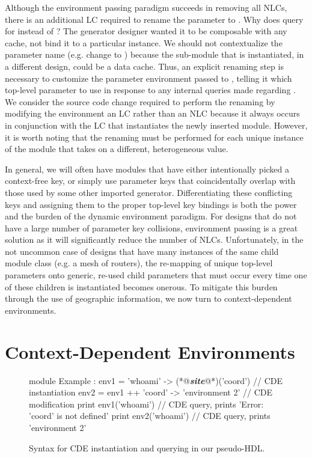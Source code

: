 Although the environment passing paradigm succeeds in removing all NLCs,
there is an additional LC required to rename the  parameter to .
Why does  query for  instead of ?
The generator designer wanted it to be composable with any cache, not bind it to a particular instance.
We should not contextualize the parameter name (e.g. change  to ) because the sub-module that is instantiated, in a different design, could be a data cache. 
Thus, an explicit renaming step is necessary to customize the parameter environment passed to , telling it which top-level parameter to use
in response to any internal queries made regarding .
We consider the source code change required to perform the renaming by modifying the environment an LC rather than an NLC because it always occurs in conjunction
with the LC that instantiates the newly inserted module.
However, it is worth noting that the renaming must be performed for each unique instance of the module that takes on a different, heterogeneous value.

In general, we will often have modules that have either intentionally picked a context-free key, or simply use parameter keys that coincidentally overlap with those
used by some other imported generator.
Differentiating these conflicting keys and assigning them to the proper top-level key bindings is both the power and the burden of the dynamic environment paradigm.
For designs that do not have a large number of parameter key collisions, environment passing is a great solution as it will significantly reduce the number of NLCs. 
Unfortunately, in the not uncommon case of designs that have many instances of the same child module class (e.g. a mesh of routers), the re-mapping of unique top-level parameters onto generic, re-used child parameters
that must occur every time one of these children is instantiated becomes onerous.
To mitigate this burden through the use of geographic information, we now turn to context-dependent environments.

\section{Context-Dependent Environments}
\label{sec:cde}

\begin{figure}
\centering
\begin{phdl}
module Example :
  env1 = {'whoami' -> (*@\textcolor[rgb]{1,0.5,0}{\textbf{\textit{site}}}@*)('coord')}                // CDE instantiation
  env2 = env1 ++ {'coord' -> 'environment 2'} // CDE modification
  print env1('whoami')                        // CDE query, prints 'Error: 'coord' is not defined'
  print env2('whoami')                        // CDE query, prints 'environment 2'
\end{phdl}
\caption{Syntax for CDE instantiation and querying in our pseudo-HDL.}
\label{fig:cde-phdl}
\end{figure}

